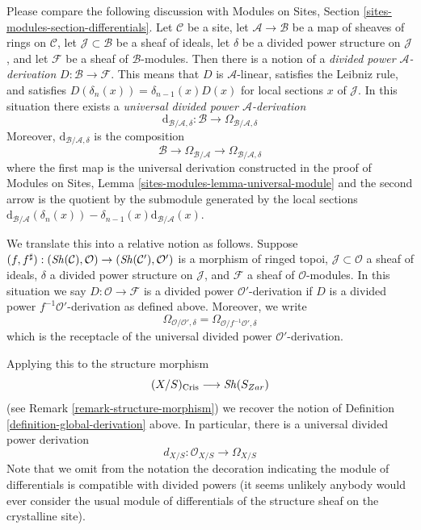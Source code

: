 \medskip\noindent
Please compare the following discussion with
Modules on Sites, Section \ref{sites-modules-section-differentials}. Let
$\mathcal{C}$ be a site, let $\mathcal{A} \to \mathcal{B}$ be a
map of sheaves of rings on $\mathcal{C}$, let $\mathcal{J} \subset \mathcal{B}$
be a sheaf of ideals, let $\delta$ be a divided power structure on
$\mathcal{J}$, and let $\mathcal{F}$ be a sheaf of $\mathcal{B}$-modules.
Then there is a notion of a {\it divided power $\mathcal{A}$-derivation}
$D : \mathcal{B} \to \mathcal{F}$. This means that $D$ is $\mathcal{A}$-linear,
satisfies the Leibniz rule, and satisfies
$D(\delta_n(x)) = \delta_{n - 1}(x)D(x)$ for local sections $x$ of
$\mathcal{J}$. In this situation there exists a
{\it universal divided power $\mathcal{A}$-derivation}
$$
\text{d}_{\mathcal{B}/\mathcal{A}, \delta} :
\mathcal{B}
\longrightarrow
\Omega_{\mathcal{B}/\mathcal{A}, \delta}
$$
Moreover, $\text{d}_{\mathcal{B}/\mathcal{A}, \delta}$ is the composition
$$
\mathcal{B}
\longrightarrow
\Omega_{\mathcal{B}/\mathcal{A}}
\longrightarrow
\Omega_{\mathcal{B}/\mathcal{A}, \delta}
$$
where the first map is the universal derivation constructed in the proof
of Modules on Sites, Lemma \ref{sites-modules-lemma-universal-module}
and the second arrow is the quotient by the submodule generated by
the local sections
$\text{d}_{\mathcal{B}/\mathcal{A}}(\delta_n(x)) -
\delta_{n - 1}(x)\text{d}_{\mathcal{B}/\mathcal{A}}(x)$.

\medskip\noindent
We translate this into a relative notion as follows. Suppose
$(f, f^\sharp) : (\mathop{\mathit{Sh}}\nolimits(\mathcal{C}), \mathcal{O}) \to
(\mathop{\mathit{Sh}}\nolimits(\mathcal{C}'), \mathcal{O}')$ is a morphism of ringed topoi,
$\mathcal{J} \subset \mathcal{O}$ a sheaf of ideals, $\delta$ a
divided power structure on $\mathcal{J}$, and $\mathcal{F}$ a sheaf
of $\mathcal{O}$-modules. In this situation we say
$D : \mathcal{O} \to \mathcal{F}$ is a divided power $\mathcal{O}'$-derivation
if $D$ is a divided power $f^{-1}\mathcal{O}'$-derivation as defined above.
Moreover, we write
$$
\Omega_{\mathcal{O}/\mathcal{O}', \delta} =
\Omega_{\mathcal{O}/f^{-1}\mathcal{O}', \delta}
$$
which is the receptacle of the universal divided power
$\mathcal{O}'$-derivation.

\medskip\noindent
Applying this to the structure morphism
$$
(X/S)_{\text{Cris}} \longrightarrow \mathop{\mathit{Sh}}\nolimits(S_{Zar})
$$
(see Remark \ref{remark-structure-morphism}) we recover the notion of
Definition \ref{definition-global-derivation} above.
In particular, there is a universal divided power derivation
$$
d_{X/S} : \mathcal{O}_{X/S} \to \Omega_{X/S}
$$
Note that we omit from the notation the decoration indicating the
module of differentials is compatible with divided powers (it seems
unlikely anybody would ever consider the usual module of differentials
of the structure sheaf on the crystalline site).

